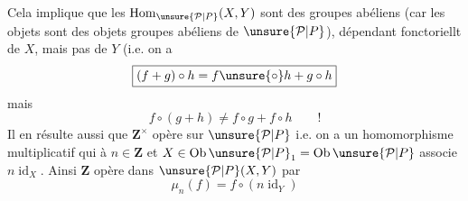 Cela implique que 
les $\operatorname{Hom}_\unsure{\mathcal P|P}(X,Y)$ sont des groupes abéliens (car les objets   sont des objets groupes abéliens de $\unsure{\mathcal P|P}$), dépendant fonctoriellt de $X$, mais pas de $Y$ (i.e. on a
\[
\boxed{(f+g)\circ h=f\unsure{\circ}h+g\circ h}
\]
mais   
\[
f\circ(g+h)\ne f\circ g+f\circ h\qquad !
\]
Il en résulte aussi que $\mathbf Z^\times$ opère sur $\unsure{\mathcal P|P}$ i.e. on a un homomorphisme multiplicatif
qui à $n\in\mathbf Z$ et $X\in\operatorname{Ob}\unsure{\mathcal P|P}_1=\operatorname{Ob}\unsure{\mathcal P|P}$ associe $n\operatorname{id}_X$.
Ainsi $\mathbf Z$ opère dans  $\unsure{\mathcal P|P}(X,Y)$ par
\[
\mu_n(f)=f\circ(n\operatorname{id}_Y)
\]

